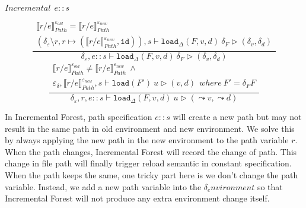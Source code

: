 \documentclass[10pt,twoside,a4paper]{article}
\theoremstyle{theorem}
\theoremstyle{lemma}
\theoremstyle{property}
\theoremstyle{definition}
\theoremstyle{assumption}
\def\id{\mathtt{id}}
\begin{document}
$\boxed{Incremental~~e::s}$

\begin{displaymath}
	\frac{\begin{array}{c}
		\llbracket r/e \rrbracket^{\varepsilon_{old}}_{Path} = \llbracket r/e \rrbracket^{\varepsilon_{new}}_{Path}\\
		(\delta_\varepsilon \setminus r, r \mapsto (\llbracket r/e \rrbracket^{\varepsilon_{new}}_{Path},\id)) , s \vdash \mathtt{load}_\Delta (F,v,d)~ \delta_F \rhd (\delta_v,\delta_d)
	\end{array}}
	{
		\delta_\varepsilon, e::s \vdash \mathtt{load}_\Delta (F,v,d)~ \delta_F \rhd (\delta_v,\delta_d)
	}
\end{displaymath}
\begin{displaymath}
	\frac{\begin{array}{c}
		\llbracket r/e \rrbracket^{\varepsilon_{old}}_{Path} \not= \llbracket r/e \rrbracket^{\varepsilon_{new}}_{Path} ~\land \\
		\varepsilon_\delta, \llbracket r/e \rrbracket^{\varepsilon_{new}}_{Path} , s \vdash \mathtt{load}(F')~ u \rhd (v,d) ~~ where ~ F' = \delta_F F
	\end{array}}
	{
		\delta_\varepsilon, r, e::s \vdash \mathtt{load}_\Delta (F,v,d)~ u \rhd (\leadsto v,\leadsto d)
	}
\end{displaymath}

In Incremental Forest, path specification $e\!::\!s$ will create a new path but may not result in the same path in old environment and new environment. 
We solve this by always applying the new path in the new environment to the path variable $r$. 
When the path changes, Incremental Forest will record the change of path. This change in file path will finally trigger reload semantic in constant specification.
When the path keeps the same, one tricky part here is we don't change the path variable. Instead, we add a new path variable into the $\delta_environment$ so that Incremental Forest will not produce any extra environment change itself.\\
\end{document}
